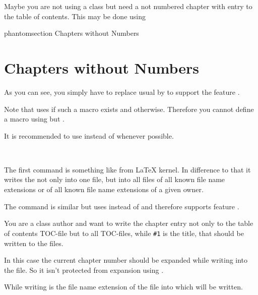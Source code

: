 \begin{Example}
  Maybe you are not using a \KOMAScript{} class but need a not numbered
  chapter with entry to the table of contents. This may be done using
\begin{lstcode}
  \cleardoublepage
  \csname phantomsection\endcsname
             {Chapters without Numbers}
  \chapter*{Chapters without Numbers}
\end{lstcode}
  As you can see, you simply have to replace usual  by
   to support the  feature
  .
\end{Example}

Note that  uses
 if such a macro exists and
 otherwise. Therefore you cannot define
a macro  using
 but .

It is recommended to use  instead of
 whenever possible.%

\begin{Declaration}
  \\
\end{Declaration}
%
%
The first command is something like  from \LaTeX{}
kernel. In difference to that it writes the  not only into
one file, but into all files of all known file name extensions or of all known
file name extensions of a given owner.

The command  is similar but uses
 instead of  and
therefore supports  feature .
\begin{Example}
  You are a class author and want to write the chapter entry not only to the
  table of contents TOC-file but to all TOC-files, while \texttt{\#1} is the
  title, that should be written to the files.
  In this case the current chapter number should be expanded while writing
  into the file. So it isn't protected from expansion using .
\end{Example}
While writing 
is the file name extension of the file into which  will be
written.

